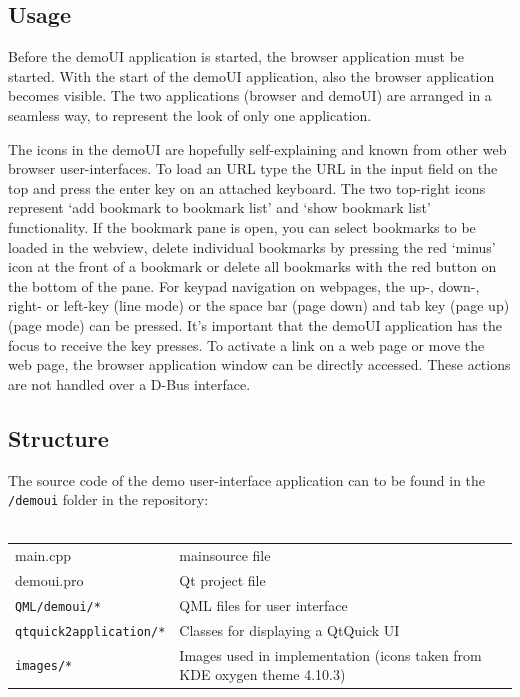 \documentclass{pelagicore}
\begin{document}
\subsection{Usage}
Before the demoUI application is started, the browser application must be
started. With the start of the demoUI application, also the browser application
becomes visible. The two applications (browser and demoUI) are arranged in a
seamless way, to represent the look of only one application.

The icons in the demoUI are hopefully self-explaining and known from other web
browser user-interfaces. To load an URL type the URL in the input field on the
top and press the enter key on an attached keyboard. The two top-right icons
represent `add bookmark to bookmark list' and `show bookmark list'
functionality. If the bookmark pane is open, you can select bookmarks to be
loaded in the webview, delete individual bookmarks by pressing the red `minus'
icon at the front of a bookmark or delete all bookmarks with the red button on
the bottom of the pane. For keypad navigation on webpages, the up-, down-,
right- or left-key (line mode) or the space bar (page down) and tab key (page
up) (page mode) can be pressed. It's important that the demoUI application has
the focus to receive the key presses. To activate a link on a web page or move
the web page, the browser application window can be directly accessed. These
actions are not handled over a D-Bus interface.

\subsection{Structure}
The source code of the demo user-interface application can to be found in the
{\tt /demoui} folder in the repository:
\\\\
\begin{tabularx}{0.9\textwidth}{l X}
    main.cpp                    & mainsource file \\
    demoui.pro                  & Qt project file \\
    {\tt QML/demoui/*}          & QML files for user interface \\
    {\tt qtquick2application/*} & Classes for displaying a QtQuick UI \\
    {\tt images/*}              & Images used in implementation (icons taken
                                  from KDE oxygen theme 4.10.3)
\end{tabularx}
\\\\
\end{document}
